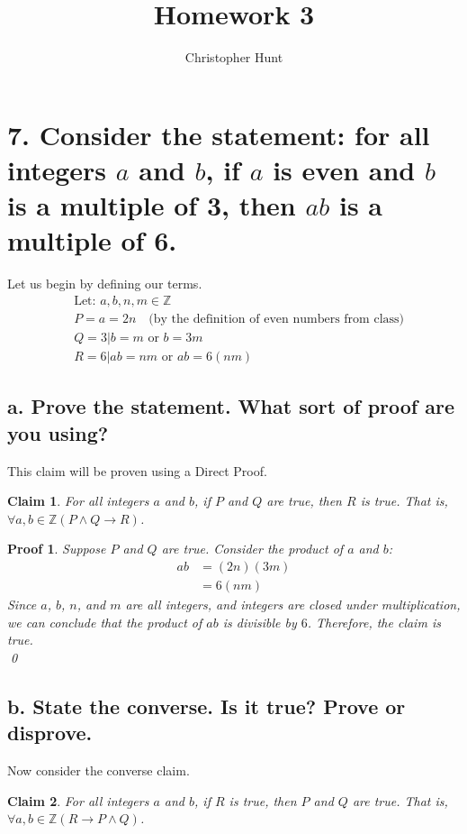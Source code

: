 \documentclass[11pt]{article}
\title{Homework 3}
\author{Christopher Hunt}
\date{}
\newtheorem*{claim}{Claim}
\newtheorem*{myproof}{Proof}
\begin{document}
\pagestyle{fancy}
\fancyhf{}
\rhead{\thepage}
\maketitle
\section*{7. Consider the statement: for all integers $a$ and $b$, if $a$ is even and $b$ is a multiple of 3, then $ab$ is a multiple of 6.}
Let us begin by defining our terms.
\begin{align*}
    &\text{Let: } a,b,n,m\in\mathbb{Z} \\
    &P = a = 2n \quad \text{(by the definition of even numbers from class)} \\
    &Q = 3|b=m \text{ or } b=3m \\
    &R = 6|ab=nm \text{ or } ab = 6(nm)
\end{align*}
\subsection*{a. Prove the statement. What sort of proof are you using?}
This claim will be proven using a Direct Proof.
\begin{claim}
For all integers $a$ and $b$, if $P$ and $Q$ are true, then $R$ is true. That is, $\forall a, b \in \mathbb{Z} (P \wedge Q \rightarrow R)$.
\end{claim}

\begin{myproof}
Suppose $P$ and $Q$ are true. Consider the product of $a$ and $b$:
\begin{align*}
    ab &= (2n)(3m) \\
       &= 6(nm)
\end{align*}
Since $a$, $b$, $n$, and $m$ are all integers, and integers are closed under multiplication, we can conclude that the product of $ab$ is divisible by $6$. Therefore, the claim is true. \\
\qed
\end{myproof}


\subsection*{b. State the converse. Is it true? Prove or disprove.}
Now consider the converse claim.
\begin{claim}
For all integers $a$ and $b$, if $R$ is true, then $P$ and $Q$ are true. That is, $\forall a, b \in \mathbb{Z} (R \rightarrow P \wedge Q)$.
\end{claim}
\end{document}
